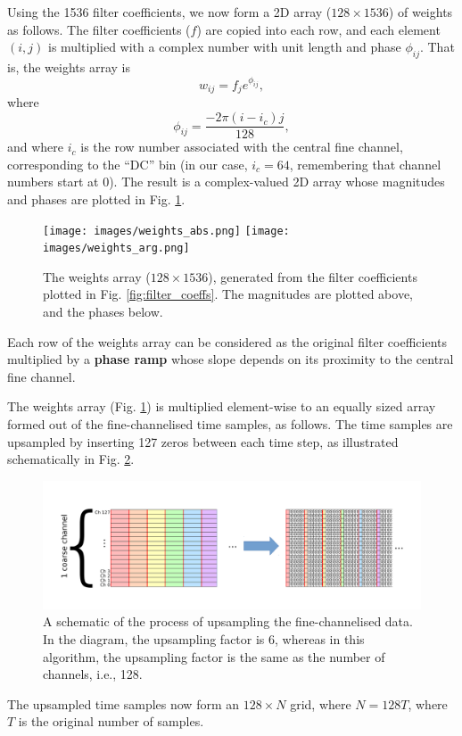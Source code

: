 \documentclass{article}
\begin{document}
Using the 1536 filter coefficients, we now form a 2D array ($128 \times 1536$) of weights as follows.
The filter coefficients ($f$) are copied into each row, and each element $(i,j)$ is multiplied with a complex number with unit length and phase $\phi_{ij}$.
That is, the weights array is
\begin{equation}
    w_{ij} = f_j e^{\phi_{ij}},
\end{equation}
where
\begin{equation}
    \phi_{ij} = \frac{-2\pi(i-i_c)j}{128},
\end{equation}
and where $i_c$ is the row number associated with the central fine channel, corresponding to the ``DC'' bin (in our case, $i_c = 64$, remembering that channel numbers start at $0$).
The result is a complex-valued 2D array whose magnitudes and phases are plotted in Fig. \ref{fig:weights}.
\begin{figure}[!b]
    \centering
    \texttt{[image: images/weights\_abs.png]}
    \texttt{[image: images/weights\_arg.png]}
    \caption{The weights array ($128 \times 1536$), generated from the filter coefficients plotted in Fig. \ref{fig:filter_coeffs}. The magnitudes are plotted above, and the phases below.}
    \label{fig:weights}
\end{figure}
Each row of the weights array can be considered as the original filter coefficients multiplied by a {\bf phase ramp} whose slope depends on its proximity to the central fine channel.

The weights array (Fig. \ref{fig:weights}) is multiplied element-wise to an equally sized array formed out of the fine-channelised time samples, as follows.
The time samples are upsampled by inserting 127 zeros between each time step, as illustrated schematically in Fig. \ref{fig:upsample}.
\begin{figure}[!ht]
    \centering
    \includegraphics[scale=0.6]{images/pfb_fig2.pdf}
    \vspace{-1cm}
    \caption{A schematic of the process of upsampling the fine-channelised data. In the diagram, the upsampling factor is 6, whereas in this algorithm, the upsampling factor is the same as the number of channels, i.e., 128.}
    \label{fig:upsample}
\end{figure}
The upsampled time samples now form an $128 \times N$ grid, where $N = 128T$, where $T$ is the original number of samples.
\end{document}
